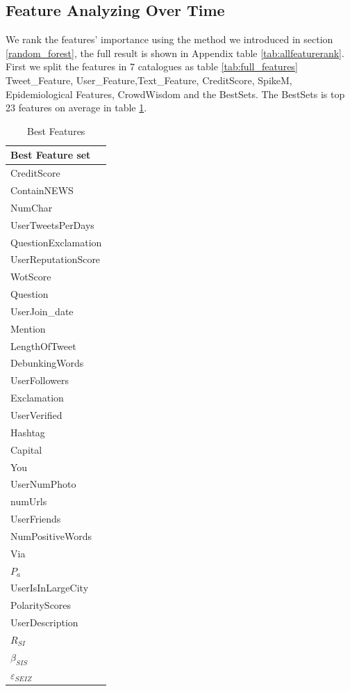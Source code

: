   
 \subsection{ Feature Analyzing Over Time} 
 We rank the features' importance using the method we introduced in section \ref{random_forest}, the full result is shown in Appendix table \ref{tab:allfeaturerank}.  First we split the features in 7 catalogues as table \ref{tab:full_features} Tweet\_Feature, User\_Feature,Text\_Feature,  CreditScore, SpikeM, Epidemiological Features, CrowdWisdom and the BestSets. The BestSets is top 23 features on average in table \ref{bestfeature}.
 
 \begin{table}[!h]
\centering
\begin{tabular}{|l|}
\hline
Best Feature set\\ \hline

 CreditScore \\
 ContainNEWS \\
 NumChar \\
 UserTweetsPerDays \\
 QuestionExclamation \\ 
 UserReputationScore \\

WotScore \\
Question \\
UserJoin\_date \\
Mention \\
LengthOfTweet \\
DebunkingWords \\ 
UserFollowers \\
Exclamation \\
UserVerified \\
Hashtag \\
Capital \\
You \\
UserNumPhoto \\
numUrls \\
UserFriends \\
NumPositiveWords \\
Via \\
$P_a$  \\
UserIsInLargeCity \\PolarityScores \\UserDescription \\$R_{SI}$\\$\beta_{SIS}$ \\ $\varepsilon_{SEIZ}$   \\ \bottomrule 
 \end{tabular}
\caption{Best Features}
\label{bestfeature}
\end{table}

 
 

  
  
  
